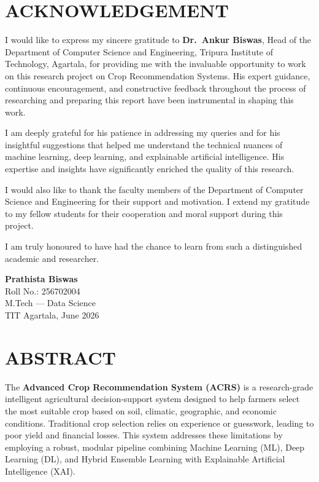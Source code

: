 \documentclass[12pt,a4paper,oneside]{report}
\begin{document}
\chapter*{ACKNOWLEDGEMENT}

I would like to express my sincere gratitude to \textbf{Dr.\ Ankur Biswas}, Head of the Department of Computer Science and Engineering, Tripura Institute of Technology, Agartala, for providing me with the invaluable opportunity to work on this research project on Crop Recommendation Systems. His expert guidance, continuous encouragement, and constructive feedback throughout the process of researching and preparing this report have been instrumental in shaping this work.

I am deeply grateful for his patience in addressing my queries and for his insightful suggestions that helped me understand the technical nuances of machine learning, deep learning, and explainable artificial intelligence. His expertise and insights have significantly enriched the quality of this research.

I would also like to thank the faculty members of the Department of Computer Science and Engineering for their support and motivation. I extend my gratitude to my fellow students for their cooperation and moral support during this project.

I am truly honoured to have had the chance to learn from such a distinguished academic and researcher.

\vspace{2cm}
\noindent\textbf{Prathista Biswas}\\
Roll No.: 256702004\\
M.Tech --- Data Science\\
TIT Agartala, June 2026
\newpage

\chapter*{ABSTRACT}

The \textbf{Advanced Crop Recommendation System (ACRS)} is a research-grade intelligent agricultural decision-support system designed to help farmers select the most suitable crop based on soil, climatic, geographic, and economic conditions. Traditional crop selection relies on experience or guesswork, leading to poor yield and financial losses. This system addresses these limitations by employing a robust, modular pipeline combining Machine Learning (ML), Deep Learning (DL), and Hybrid Ensemble Learning with Explainable Artificial Intelligence (XAI).
\end{document}
